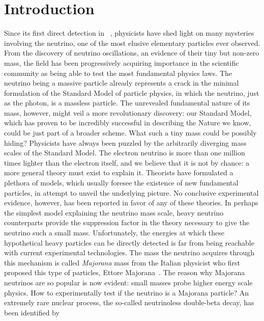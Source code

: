 
\chapter{Introduction}%
\label{chap:introduction}

Since its first direct detection in ~\cite{Cowan1956}, physicists have shed light
on many mysteries involving the neutrino, one of the most elusive elementary particles
ever observed. From the discovery of neutrino oscillations, an evidence of their tiny but
non-zero mass, the field has been progressively acquiring importance in the scientific
community as being able to test the most fundamental physics laws. The neutrino being a
massive particle already represents a crack in the minimal formulation of the Standard
Model of particle physics, in which the neutrino, just as the photon, is a massless
particle. The unrevealed fundamental nature of its mass, however, might veil a more
revolutionary discovery: our Standard Model, which has proven to be incredibly
successful in describing the Nature we know, could be just part of a broader scheme.
\newpar
What such a tiny mass could be possibly hiding? Physicists have always been puzzled by the
arbitrarily diverging mass scales of the Standard Model. The electron neutrino is more
than one million times lighter than the electron itself, and we believe that it is not by
chance: a more general theory must exist to explain it. Theorists have formulated a
plethora of models, which usually foresee the existence of new fundamental particles, in
attempt to unveil the underlying picture. No conclusive experimental evidence, however,
has been reported in favor of any of these theories. In perhaps the simplest model
explaining the neutrino mass scale, heavy neutrino counterparts provide the suppression
factor in the theory necessary to give the neutrino such a small mass. Unfortunately, the
energies at which these hypothetical heavy particles can be directly detected is far from
being reachable with current experimental technologies. The mass the neutrino acquires
through this mechanism is called \emph{Majorana} mass from the Italian physicist who first
proposed this type of particles, Ettore Majorana~\cite{Majorana1932}. The reason why
Majorana neutrinos are so popular is now evident: small masses probe higher energy scale
physics.
\newpar
How to experimentally test if the neutrino is a Majorana particle? An extremely rare
nuclear process, the so-called neutrinoless double-beta decay, has been identified by
